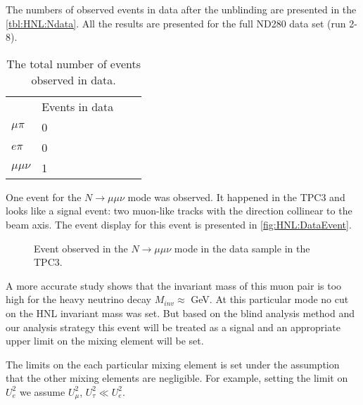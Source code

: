 \documentclass[../main.tex]{subfiles}
\begin{document}
The numbers of observed events in data after the unblinding are presented in the \autoref{tbl:HNL:Ndata}. All the results are presented for the full ND280 data set (run 2-8).

\begin{table}[!ht]
\begin{center}
\begin{tabular}{llll}
                            & Events in data      \\
  $\mu\pi$ \hspace{0.5cm}   & 0  \hspace{2cm}     \\
  $e\pi$                    & 0                   \\
  $\mu\mu\nu$               & 1                   \\
\end{tabular}
\caption{The total number of events observed in data.}
\label{tbl:HNL:Ndata}
\end{center}
\end{table}

One event for the $N\to\mu\mu\nu$ mode was observed. It happened in the TPC3 and looks like a signal event: two muon-like tracks with the direction collinear to the beam axis. The event display for this event is presented in \autoref{fig:HNL:DataEvent}.

\begin{figure}[!ht]
    \begin{center}
  \begin{minipage}{0.49\linewidth}
  \end{minipage}
  \begin{minipage}{0.49\linewidth}
  \end{minipage}
  \caption{Event observed in the $N\to\mu\mu\nu$ mode in the data sample in the TPC3.}
  \label{fig:HNL:DataEvent}
  \end{center}
\end{figure}

A more accurate study shows that the invariant mass of this muon pair is too high for the heavy neutrino decay $M_{inv}\approx$ GeV. At this particular mode no cut on the HNL invariant mass was set. But based on the blind analysis method and our analysis strategy this event will be treated as a signal and an appropriate upper limit on the mixing element will be set.

The limits on the each particular mixing element is set under the assumption that the other mixing elements are negligible. For example, setting the limit on $U_e^2$ we assume $U_\mu^2$, $U_\tau^2\ll U_e^2$.
\end{document}
